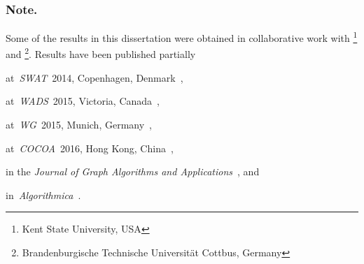 \subsubsection{Note.}
Some of the results in this dissertation were obtained in collaborative work with \footnote{Kent State University, USA} and \footnote{Brandenburgische Technische Universität Cottbus, Germany}.
Results have been published partially
\begin{itemize*}[label={},afterlabel={},mode=unboxed]
    \item
        at~\emph{SWAT}~2014, Copenhagen, Denmark~\cite{DragKoehLeit2014},
    \item
        at~\emph{WADS}~2015, Victoria, Canada~\cite{DraganLeiter2015},
    \item
        at~\emph{WG}~2015, Munich, Germany~\cite{DraganLeiter2015a},
    \item
        at~\emph{COCOA}~2016, Hong Kong, China~\cite{LeiterDragan2016},
    \item
        in the \emph{Journal of Graph Algorithms and Applications}~\cite{DraganLeiter2016}, and
    \item
        in~\emph{Algorithmica}~\cite{DragKoehLeit2017}.
\end{itemize*}
